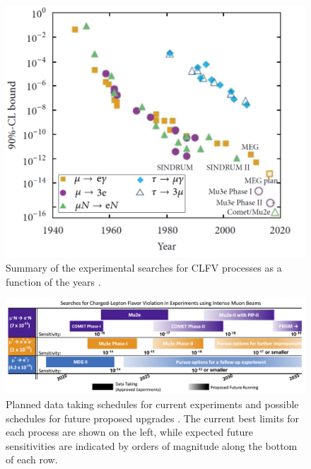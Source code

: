 \documentclass[12pt,a4paper,openright, oneside, titlepage]{book} %
\begin{document}
\begin{figure}[h!]
\centering
\includegraphics[scale=0.7]{timeline_measures}
\caption[History of CLFV searches]{Summary of the experimental searches for CLFV processes as a function of the years \cite{Chiappini}.}
\label{timeline_measures}
\end{figure}

\begin{figure}[h!]
\centering
\includegraphics[scale=0.5]{timeline_future}
\caption[Experiments schedules]{Planned data taking schedules for current experiments and possible schedules for future proposed upgrades \cite{Baldini:2019}. The current best limits for each process are shown on the left, 
while expected future sensitivities are indicated by orders of magnitude along the bottom of each row.}
\label{_timeline_future}
\end{figure}
\end{document}
